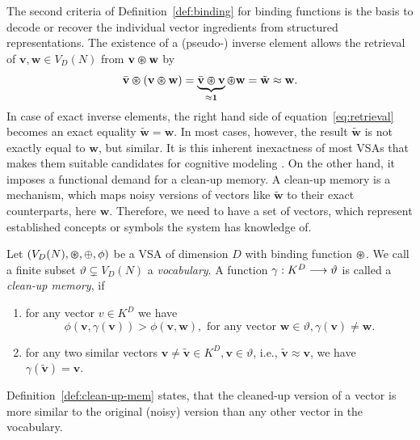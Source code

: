 The second criteria of Definition~\ref{def:binding} for binding functions is the basis to decode or recover the individual vector ingredients from structured representations.
The existence of a (pseudo-) inverse element allows the retrieval of $ \mathbf{v}, \mathbf{w} \in V_{D}(N)$ from $ \mathbf{v} \varoast \mathbf{w}$ by
\begin{equation}
\label{eq:retrieval}
\bar{\mathbf{v}} \varoast \left(\mathbf{v} \varoast \mathbf{w}\right) = \underbrace{\bar{\mathbf{v}} \varoast \mathbf{v}}_{\approx \mathbf{1}} \varoast \mathbf{w} = \tilde{\mathbf{w}} \approx \mathbf{w}.
\end{equation}
In case of exact inverse elements, the right hand side of equation~\eqref{eq:retrieval} becomes an exact equality $\tilde{\mathbf{w}}= \mathbf{w}$.
In most cases, however, the result $\tilde{\mathbf{w}}$ is not exactly equal to $ \mathbf{w}$, but similar.
It is this inherent inexactness of most \acp{VSA} that makes them suitable candidates for cognitive modeling \parencite{Eliasmith2013}.
On the other hand, it imposes a functional demand for a clean-up memory.
A clean-up memory is a mechanism, which maps noisy versions of vectors like $\tilde{\mathbf{w}}$ to their exact counterparts, here $ \mathbf{w}$.
Therefore, we need to have a set of vectors, which represent established concepts or symbols the system has knowledge of.

\begin{defn}
	\label{def:clean-up-mem}
	Let $(V_{D}(N), \varoast, \oplus, \phi)$ be a \acrfull{VSA} of dimension $D$ with binding function $\varoast$.
	We call a finite subset $\vartheta \subsetneq V_{D}(N)$ a \emph{vocabulary}.
	A function $\gamma: K^{D} \longrightarrow \vartheta$ is called a \emph{clean-up memory}, if
	\begin{enumerate}
		\item for any vector $v\in K^{D}$ we have
		\[
		\phi\left( \mathbf{v}, \gamma(\mathbf{v})\right) > \phi\left( \mathbf{v}, \mathbf{w}\right), \textrm{ for any vector } \mathbf{w} \in \vartheta, \gamma( \mathbf{v}) \neq \mathbf{w}.
		\]
		\item for any two similar vectors $ \mathbf{v} \neq \tilde{\mathbf{v}} \in K^{D}, \mathbf{v} \in \vartheta$, i.e., $\tilde{\mathbf{v}} \approx \mathbf{v}$, we have $\gamma(\tilde{\mathbf{v}})= \mathbf{v}$.
	\end{enumerate}
\end{defn}
Definition~\ref{def:clean-up-mem} states, that the cleaned-up version of a vector is more similar to the original (noisy) version than any other vector in the vocabulary.

